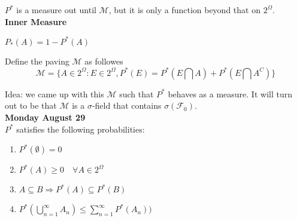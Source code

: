 \documentclass[11pt,fleqn]{book} %
\begin{document}
	$P^*$ is a measure out until $\mathcal{M}$, but it is only a function beyond that on $2^\Omega$.\\

\textbf{Inner Measure}

$P_*(A) = 1 - P^*(A)$ 

\vspace{5mm}

Define the paving $\mathcal{M}$ as followes
$$\mathcal{M} = \{ A \in 2^\Omega:
		E \in 2^\Omega,
		P^*(E) = P^*(E\bigcap A) + P^*(E \bigcap A^C) \}$$

	Idea: we came up with this $\mathcal{M}$ such that $P^*$ behaves as a measure. It will turn out to be that $\mathcal{M}$ is a $\sigma$-field that contains $\sigma(\mathcal{F}_0)$.\\

\textbf{Monday August 29}\\

$P^*$ satisfies the following probabilities:

\begin{enumerate}[label = (\roman*)]
	\item $P^*(\emptyset) = 0$
	\item $P^*(A) \geq 0 \quad \forall A \in 2^\Omega$
	\item $A \subseteq B \Rightarrow P^*(A) \subseteq P^*(B)$
	\item $P^*(\bigcup^\infty_{n=1} A_n) \leq \displaystyle \sum^\infty_{n=1} P^*(A_n))$
\end{enumerate}
\end{document}
